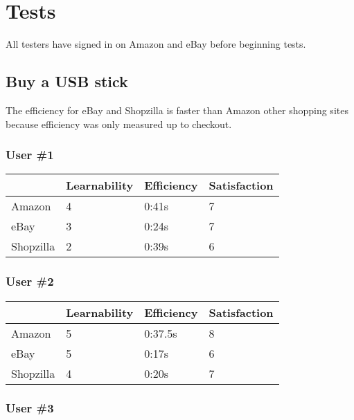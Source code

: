 \documentclass[11pt, oneside]{article}
\begin{document}
\section{Tests}

All testers have signed in on Amazon and eBay before beginning tests.

\subsection{Buy a USB stick}

The efficiency for eBay and Shopzilla is faster than Amazon other shopping sites because efficiency was only measured up to checkout.

\subsubsection{User \#1}

\begin{center}     
\begin{tabular}{| l | l | l | l |}
    \hline
     & Learnability & Efficiency & Satisfaction \\ \hline
    Amazon & 4 & 0:41s & 7 \\ \hline
    eBay & 3 & 0:24s & 7 \\ \hline
    Shopzilla & 2 & 0:39s & 6 \\\hline
\end{tabular}
\end{center}

\subsubsection{User \#2}

\begin{center}
\begin{tabular}{| l | l | l | l |}
    \hline
     & Learnability & Efficiency & Satisfaction \\ \hline
    Amazon & 5 & 0:37.5s & 8 \\ \hline
    eBay & 5 & 0:17s & 6 \\ \hline
    Shopzilla & 4 & 0:20s & 7 \\ \hline
\end{tabular}
\end{center}

\subsubsection{User \#3}
\end{document}

